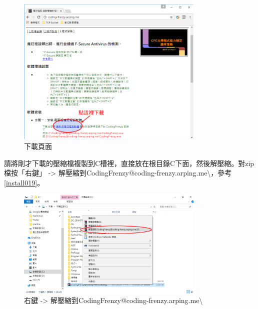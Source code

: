 		\begin{figure}[H]
			\centering
			\includegraphics[width=0.8\textwidth]{fig/install_and_setting/install_018}
			\caption{下載頁面}
			\label{install018}
		\end{figure}
		
		 請將剛才下載的壓縮檔複製到C槽裡，直接放在根目錄C下面，然後解壓縮。對zip檔按「右鍵」 -> 解壓縮到CodingFrenzy@coding-frenzy.arping.me\textbackslash，參考\autoref{install019}。
		\begin{figure}[H]
			\centering
			\includegraphics[width=0.8\textwidth]{fig/install_and_setting/install_019}
			\caption{右鍵 -> 解壓縮到CodingFrenzy@coding-frenzy.arping.me\textbackslash}
			\label{install019}
		\end{figure}
		
